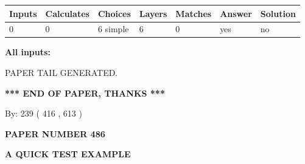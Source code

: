 \documentclass[12pt]{article}
\begin{document}
 
\noindent{}
 
 
   
   
   
   
\noindent\begin{tabular}{|l|l|l|l|l|l|l|}
 \hline
Inputs & Calculates & Choices & Layers & Matches & Answer & Solution \\ \hline
 0  & 
 0  & 
 6
  simple  
  & 
 6  & 
 0  & 
  yes & 
  no 
  \\ \hline
 \end{tabular}
   
   
   
   
\noindent{}
   
   
   
   
\noindent\vspace{0.1in}\hspace{-0.08in} {\textbf{\Large{All inputs: }}}
   
   
   
   
   
   
 \vspace{0.2in}
 
   
   
\vspace{2.0in} PAPER TAIL GENERATED.
   
   
   
   
\vspace{1.0in} 
{\textbf{\large{ *** END OF PAPER, THANKS *** }}} 
   
   
\hspace{1.0in} By: 
 239 ( 416 ,  613 )
   
   
   
   
\newpage 
\setcounter{page}{ 
   486001 } 
   
   
   
   
 {\textbf{ \Large{ PAPER NUMBER  486  }}}
   
   
\vspace{0.2in}
   
   
   
   
   
   
   
   
 \vspace{0.2in}
{\LARGE {\textbf{ A QUICK TEST EXAMPLE}}}
   
\end{document}
